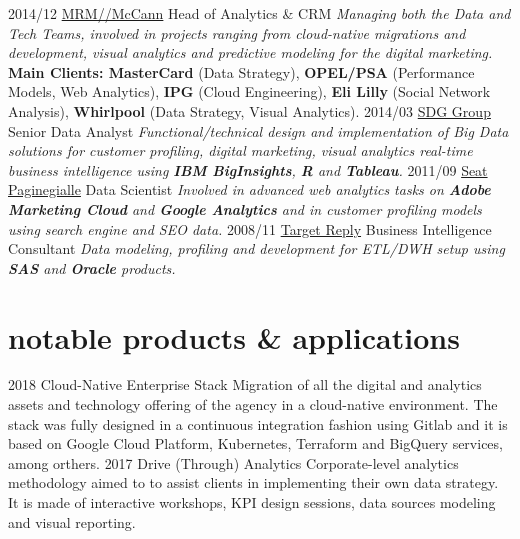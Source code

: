 \documentclass[hidelinks]{gabrielebaldassarre-cv}
\begin{document}
\begin{entrylist}
  \entry
    {2014/12}
    {\href{https://mrm-mccann.com/locations/it/en/milan.html}{MRM//McCann}}
    {Head of Analytics \& CRM}
    {\emph{Managing both the Data and Tech Teams, involved in projects ranging from
cloud-native migrations and development, visual analytics and predictive modeling for the digital marketing.}\\

    \textbf{Main Clients: MasterCard} (Data Strategy), \textbf{OPEL/PSA} (Performance Models, Web Analytics), \textbf{IPG} (Cloud Engineering), \textbf{Eli Lilly} (Social Network Analysis), \textbf{Whirlpool} (Data Strategy, Visual Analytics).}
  \entry
    {2014/03}
    {\href{http://www.sdggroup.com/it}{SDG Group}}
    {Senior Data Analyst}
    {\emph{Functional/technical design and implementation of Big Data solutions for customer profiling, digital marketing, visual analytics real-time business intelligence using \textbf{IBM BigInsights}, \textbf{R} and \textbf{Tableau}.}}
  \entry
    {2011/09}
    {\href{http://www.paginegialle.it}{Seat Paginegialle}}
    {Data Scientist}
    {\emph{Involved in advanced web analytics tasks on \textbf{Adobe Marketing Cloud} and \textbf{Google Analytics} and in customer profiling models using search engine and SEO data.}}
  \entry
    {2008/11}
    {\href{https://www.reply.com/it/topics/big-data-and-analytics/homepage}{Target Reply}}
    {Business Intelligence Consultant}
    {\emph{Data modeling, profiling and development for ETL/DWH setup using \textbf{SAS} and \textbf{Oracle} products.}}
\end{entrylist}

\section{notable products \& applications}

\begin{entrylist}
  \entry
    {2018}
    {Cloud-Native Enterprise Stack}
    {}
    {Migration of all the digital and analytics assets and technology offering of the agency in a cloud-native environment. The stack was fully designed in a continuous integration fashion using Gitlab and it is based on Google Cloud Platform, Kubernetes, Terraform and BigQuery services, among orthers.}
  \entry
    {2017}
    {Drive (Through) Analytics}
    {}
    {Corporate-level analytics methodology aimed to to assist clients in implementing their own data strategy. It is made of interactive workshops, KPI design sessions, data sources modeling and visual reporting.}
\end{entrylist}
\end{document}
